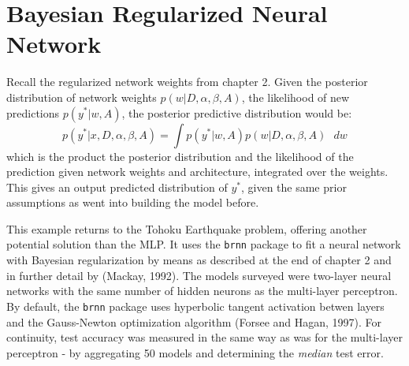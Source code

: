 \section{Bayesian Regularized Neural Network}

Recall the regularized network weights from chapter 2. Given the posterior distribution of network weights $p(w|D,\alpha,\beta,A)$, the likelihood of new predictions $p(y^*|w,A)$, the posterior predictive distribution would be:
$$
p(y^*|x,D,\alpha,\beta,A) = \int p(y^*|w,A) p(w|D,\alpha,\beta,A) \text{ } dw
$$
which is the product the posterior distribution and the likelihood of the prediction given network weights and architecture, integrated over the weights.  This gives an output predicted distribution of $y^*$, given the same prior assumptions as went into building the model before.

This example returns to the Tohoku Earthquake problem, offering another potential solution than the MLP.  It uses the \texttt{brnn} package \cite{brnn} to fit a neural network with Bayesian regularization by means as described at the end of chapter 2 and in further detail by (Mackay, 1992).
The models surveyed were two-layer neural networks with the same number of hidden neurons as the multi-layer perceptron.  By default, the \texttt{brnn} package uses hyperbolic tangent activation betwen layers and the Gauss-Newton optimization algorithm (Forsee and Hagan, 1997). For continuity, test accuracy was measured in the same way as was for the multi-layer perceptron - by aggregating 50 models and determining the \textit{median} test error.

